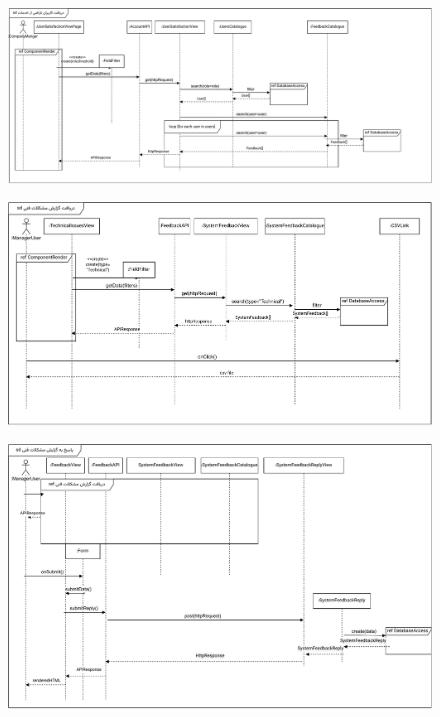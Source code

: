 \FloatBarrier
\newpage

\eject \pdfpagewidth=10in \pdfpageheight=9in

\begin{figure}[ht!]
	\centering
	\includegraphics[scale=0.8]{figs/design-sequence/3-38.pdf}
\end{figure}

\FloatBarrier
\newpage

\eject \pdfpagewidth=13in \pdfpageheight=9in

\FloatBarrier
\begin{figure}[ht!]
	\centering
	\includegraphics[scale=0.8]{figs/design-sequence/3-39.pdf}
\end{figure}
\FloatBarrier
\newpage

\eject \pdfpagewidth=11in \pdfpageheight=9in


\begin{figure}[ht!]
	\centering
	\includegraphics[scale=0.8]{figs/design-sequence/3-40.pdf}
\end{figure}

